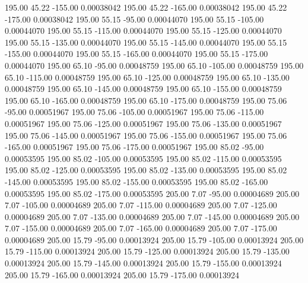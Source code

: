     195.00     45.22   -155.00     0.00038042
    195.00     45.22   -165.00     0.00038042
    195.00     45.22   -175.00     0.00038042
    195.00     55.15    -95.00     0.00044070
    195.00     55.15   -105.00     0.00044070
    195.00     55.15   -115.00     0.00044070
    195.00     55.15   -125.00     0.00044070
    195.00     55.15   -135.00     0.00044070
    195.00     55.15   -145.00     0.00044070
    195.00     55.15   -155.00     0.00044070
    195.00     55.15   -165.00     0.00044070
    195.00     55.15   -175.00     0.00044070
    195.00     65.10    -95.00     0.00048759
    195.00     65.10   -105.00     0.00048759
    195.00     65.10   -115.00     0.00048759
    195.00     65.10   -125.00     0.00048759
    195.00     65.10   -135.00     0.00048759
    195.00     65.10   -145.00     0.00048759
    195.00     65.10   -155.00     0.00048759
    195.00     65.10   -165.00     0.00048759
    195.00     65.10   -175.00     0.00048759
    195.00     75.06    -95.00     0.00051967
    195.00     75.06   -105.00     0.00051967
    195.00     75.06   -115.00     0.00051967
    195.00     75.06   -125.00     0.00051967
    195.00     75.06   -135.00     0.00051967
    195.00     75.06   -145.00     0.00051967
    195.00     75.06   -155.00     0.00051967
    195.00     75.06   -165.00     0.00051967
    195.00     75.06   -175.00     0.00051967
    195.00     85.02    -95.00     0.00053595
    195.00     85.02   -105.00     0.00053595
    195.00     85.02   -115.00     0.00053595
    195.00     85.02   -125.00     0.00053595
    195.00     85.02   -135.00     0.00053595
    195.00     85.02   -145.00     0.00053595
    195.00     85.02   -155.00     0.00053595
    195.00     85.02   -165.00     0.00053595
    195.00     85.02   -175.00     0.00053595
    205.00      7.07    -95.00     0.00004689
    205.00      7.07   -105.00     0.00004689
    205.00      7.07   -115.00     0.00004689
    205.00      7.07   -125.00     0.00004689
    205.00      7.07   -135.00     0.00004689
    205.00      7.07   -145.00     0.00004689
    205.00      7.07   -155.00     0.00004689
    205.00      7.07   -165.00     0.00004689
    205.00      7.07   -175.00     0.00004689
    205.00     15.79    -95.00     0.00013924
    205.00     15.79   -105.00     0.00013924
    205.00     15.79   -115.00     0.00013924
    205.00     15.79   -125.00     0.00013924
    205.00     15.79   -135.00     0.00013924
    205.00     15.79   -145.00     0.00013924
    205.00     15.79   -155.00     0.00013924
    205.00     15.79   -165.00     0.00013924
    205.00     15.79   -175.00     0.00013924
